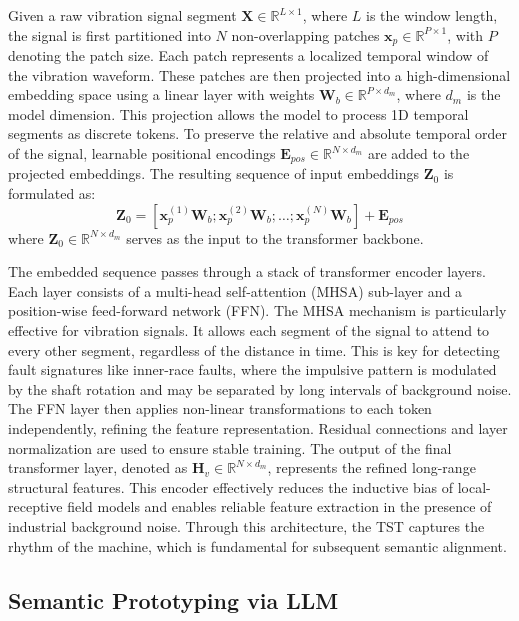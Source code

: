 \documentclass[journal]{IEEEtran}
\begin{document}
Given a raw vibration signal segment $\mathbf{X} \in \mathbb{R}^{L \times 1}$, where $L$ is the window length, the signal is first partitioned into $N$ non-overlapping patches $\mathbf{x}_p \in \mathbb{R}^{P \times 1}$, with $P$ denoting the patch size. Each patch represents a localized temporal window of the vibration waveform. These patches are then projected into a high-dimensional embedding space using a linear layer with weights $\mathbf{W}_b \in \mathbb{R}^{P \times d_m}$, where $d_m$ is the model dimension. This projection allows the model to process 1D temporal segments as discrete tokens. To preserve the relative and absolute temporal order of the signal, learnable positional encodings $\mathbf{E}_{pos} \in \mathbb{R}^{N \times d_m}$ are added to the projected embeddings. The resulting sequence of input embeddings $\mathbf{Z}_0$ is formulated as:
\begin{equation}
\mathbf{Z}_0 = [\mathbf{x}_p^{(1)}\mathbf{W}_b; \mathbf{x}_p^{(2)}\mathbf{W}_b; \dots; \mathbf{x}_p^{(N)}\mathbf{W}_b] + \mathbf{E}_{pos}
\end{equation}
where $\mathbf{Z}_0 \in \mathbb{R}^{N \times d_m}$ serves as the input to the transformer backbone.

The embedded sequence passes through a stack of transformer encoder layers. Each layer consists of a multi-head self-attention (MHSA) sub-layer and a position-wise feed-forward network (FFN). The MHSA mechanism is particularly effective for vibration signals. It allows each segment of the signal to attend to every other segment, regardless of the distance in time. This is key for detecting fault signatures like inner-race faults, where the impulsive pattern is modulated by the shaft rotation and may be separated by long intervals of background noise. The FFN layer then applies non-linear transformations to each token independently, refining the feature representation. Residual connections and layer normalization are used to ensure stable training. The output of the final transformer layer, denoted as $\mathbf{H}_v \in \mathbb{R}^{N \times d_m}$, represents the refined long-range structural features. This encoder effectively reduces the inductive bias of local-receptive field models and enables reliable feature extraction in the presence of industrial background noise. Through this architecture, the TST captures the rhythm of the machine, which is fundamental for subsequent semantic alignment.

\subsection{Semantic Prototyping via LLM}
\end{document}
